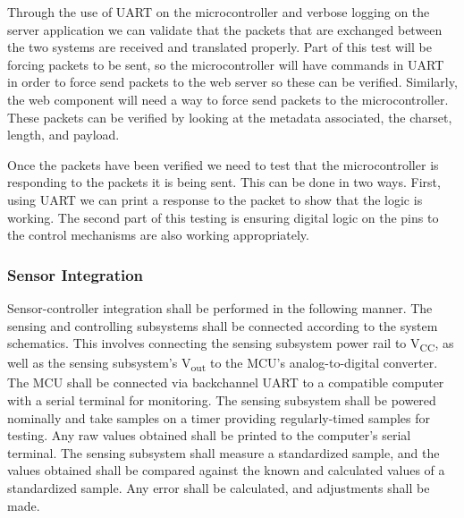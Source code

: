 Through the use of UART on the microcontroller and verbose logging on the server application we can validate that the packets that are exchanged between the two systems are received and translated properly. Part of this test will be forcing packets to be sent, so the microcontroller will have commands in UART in order to force send packets to the web server so these can be verified. Similarly, the web component will need a way to force send packets to the microcontroller. These packets can be verified by looking at the metadata associated, the charset, length, and payload.

Once the packets have been verified we need to test that the microcontroller is responding to the packets it is being sent. This can be done in two ways. First, using UART we can print a response to the packet to show that the logic is working. The second part of this testing is ensuring digital logic on the pins to the control mechanisms are also working appropriately.

\subsubsection{Sensor Integration}
Sensor-controller integration shall be performed in the following manner. The sensing and controlling subsystems shall be connected according to the system schematics. This involves connecting the sensing subsystem power rail to V\textsubscript{CC}, as well as the sensing subsystem's V\textsubscript{out} to the MCU's analog-to-digital converter. The MCU shall be connected via backchannel UART to a compatible computer with a serial terminal for monitoring. The sensing subsystem shall be powered nominally and take samples on a timer providing regularly-timed samples for testing. Any raw values obtained shall be printed to the computer's serial terminal. The sensing subsystem shall measure a standardized sample, and the values obtained shall be compared against the known and calculated values of a standardized sample. Any error shall be calculated, and adjustments shall be made.

